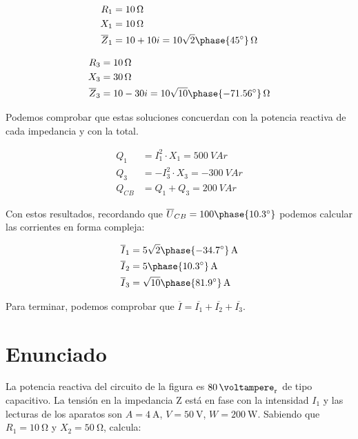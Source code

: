 \begin{align*}
  R_1 &= \qty{10}{\ohm}\\
  X_1 &= \qty{10}{\ohm}\\
  \overline{Z}_1 &= 10 + 10i = \qty[parse-numbers=false]{10\sqrt{2}\phase{\ang{45}}}{\ohm}
\end{align*}

\begin{align*}
  R_3 &= \qty{10}{\ohm}\\
  X_3 &= \qty{30}{\ohm}\\
  \overline{Z}_3 &= 10 - 30i = \qty[parse-numbers=false]{10\sqrt{10}\phase{\ang{-71.56}}}{\ohm}
\end{align*}

Podemos comprobar que estas soluciones concuerdan con la potencia
reactiva de cada impedancia y con la total.

\begin{align*}
  Q_1 &= I_1^2 \cdot X_1 = \qty{500}{VA}r\\
  Q_3 &= - I_3^2 \cdot X_3 = \qty{-300}{VA}r\\
  Q_{CB} &= Q_1 + Q_3 =\qty{200}{VA}r
\end{align*}

Con estos resultados, recordando que  $\overline{U}_{CB} =
100\phase{\ang{10.3}}$ podemos calcular las corrientes en forma
compleja:

\begin{align*}
  \overline{I}_1 &=  \qty[parse-numbers=false]{5\sqrt{2}\phase{\ang{-34.7}}}{\ampere}\\
  \overline{I}_2 &=  \qty[parse-numbers=false]{5\phase{\ang{10.3}}}{\ampere}\\
  \overline{I}_3 &=
  \qty[parse-numbers=false]{\sqrt{10}\phase{\ang{81.9}}}{\ampere}
\end{align*}

Para terminar, podemos comprobar que $\overline{I} = \overline{I_1}
+ \overline{I_2} + \overline{I_3}$.


\section{Enunciado}

La potencia reactiva del circuito de la figura es $\qty{80}{\voltampere_r}$ de tipo capacitivo. La tensión en la impedancia Z está en fase con la intensidad $I_1$ y las lecturas de los aparatos son $A = \qty{4}{\ampere}$, $V = \qty{50}{\volt}$, $W = \qty{200}{\watt}$. Sabiendo que $R_1 = \qty{10}{\ohm}$ y $X_2 = \qty{50}{\ohm}$, calcula:

